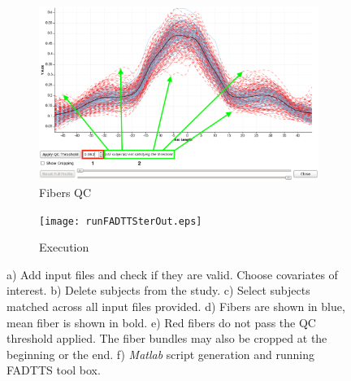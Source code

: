 \documentclass[]{spie}  %
\begin{document}
\begin{figure}
	\begin{subfigure}{0.45\textwidth}
    	\includegraphics[width=\textwidth]{applyQC2Out.eps}
    	\caption{Fibers QC}
    	\label{fig:applyQC2}
	\end{subfigure}
	\begin{subfigure}{0.45\textwidth}
		\texttt{[image: runFADTTSterOut.eps]}
		\caption{Execution}
		\label{fig:executionTab}
	\end{subfigure}

	\caption[Setting inputs]{ 
	a) Add input files and check if they are valid. Choose covariates of interest. 
	b) Delete subjects from the study. 
	c) Select subjects matched across all input files provided.
	d) Fibers are shown in blue, mean fiber is shown in bold. 
	e) Red fibers do not pass the QC threshold applied. The fiber bundles may also be cropped at the beginning or the end.
	f) \textit{Matlab} script generation and running FADTTS tool box.}
	\label{fig:FADTTSterApp}
\end{figure} 
\end{document}
